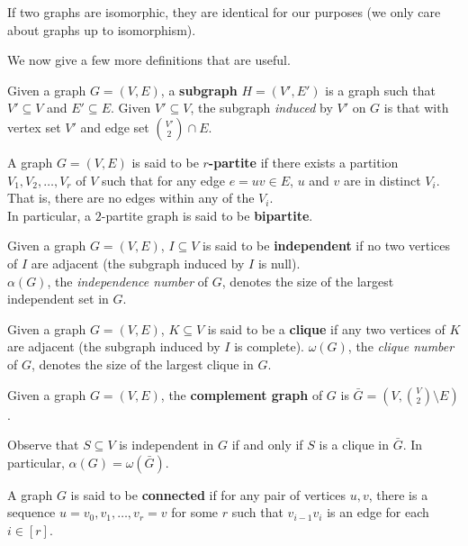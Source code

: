 		If two graphs are isomorphic, they are identical for our purposes (we only care about graphs up to isomorphism).

		We now give a few more definitions that are useful.

		\begin{fdef}[Subgraph]
			Given a graph $G = (V,E)$, a \textbf{subgraph} $H = (V',E')$ is a graph such that $V' \subseteq V$ and $E' \subseteq E$. Given $V' \subseteq V$, the subgraph \emph{induced} by $V'$ on $G$ is that with vertex set $V'$ and edge set $\binom{V'}{2} \cap E$.
		\end{fdef}

		\begin{fdef}
			A graph $G = (V,E)$ is said to be \textbf{$r$-partite} if there exists a partition $V_1, V_2, \ldots, V_r$ of $V$ such that for any edge $e = uv \in E$, $u$ and $v$ are in distinct $V_i$. That is, there are no edges within any of the $V_i$.\\
			In particular, a $2$-partite graph is said to be \textbf{bipartite}.
		\end{fdef}

		\begin{fdef}
			Given a graph $G=(V,E)$, $I \subseteq V$ is said to be \textbf{independent} if no two vertices of $I$ are adjacent (the subgraph induced by $I$ is null).\\
			$\alpha(G)$, the \emph{independence number} of $G$, denotes the size of the largest independent set in $G$.
		\end{fdef}

		\begin{fdef}[Clique]
			Given a graph $G=(V,E)$, $K \subseteq V$ is said to be a \textbf{clique} if any two vertices of $K$ are adjacent (the subgraph induced by $I$ is complete).
			$\omega(G)$, the \emph{clique number} of $G$, denotes the size of the largest clique in $G$.
		\end{fdef}

		\begin{fdef}
			Given a graph $G=(V,E)$, the \textbf{complement graph} of $G$ is $\bar{G} = (V,\binom{V}{2} \setminus E)$.
		\end{fdef}

		Observe that $S \subseteq V$ is independent in $G$ if and only if $S$ is a clique in $\bar{G}$. In particular, $\alpha(G) = \omega(\bar{G})$.

		\begin{fdef}[Connectedness]
			A graph $G$ is said to be \textbf{connected} if for any pair of vertices $u, v$, there is a sequence $u=v_0,v_1,\ldots,v_r = v$ for some $r$ such that $v_{i-1} v_i$ is an edge for each $i\in[r]$.
		\end{fdef}

